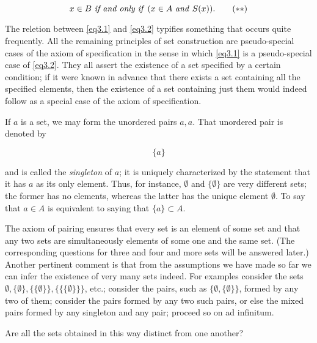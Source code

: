 \begin{equation}
\label{eq3.2}
x \in B \text{ \textit{if and only if} } (x \in A \text{ \textit{and} }  S(x)). \tag{$\ast \ast$}
\end{equation}

The reletion between \eqref{eq3.1} and \eqref{eq3.2} typifies something that occurs quite frequently. All the remaining principles of set construction are pseudo-special cases of the axiom of specification in the sense in which \eqref{eq3.1} is a pseudo-special case of \eqref{eq3.2}. They all assert the existence of a set specified by a certain condition; if it were known in advance that there exists a set containing all the specified elements, then the existence of a set containing just them would indeed follow as a special case of the axiom of specification. 

If $a$ is a set, we may form the unordered pairs ${a, a}$. That unordered pair is denoted by 

\begin{equation*}
\{ a \}
\end{equation*}

and is called the \textit{singleton} of $a$; it is uniquely characterized by the statement that it has $a$ as its only element. Thus, for instance, $ \emptyset $ and $ \{ \emptyset \}$ are very different sets; the former has no elements, whereas the latter has the unique element $ \emptyset $. To say that $a \in A$ is equivalent to saying that $\{a\} \subset A$. 

The axiom of pairing ensures that every set is an element of some set and that any two sets are simultaneously elements of some one and the same set. (The corresponding questions for three and four and more sets will be answered later.) Another pertinent comment is that from the assumptions we have made so far we can infer the existence of very many sets indeed. For examples  consider the sets $ \emptyset, \{ \emptyset \}, \{ \{ \emptyset \} \}, \{ \{ \{ \emptyset \} \} \} $, etc.; consider the pairs, such as  $ \{ \emptyset, \{ \emptyset \} \}$, formed by any two of them; consider the pairs formed by any two such pairs, or else the mixed pairs formed by any singleton and any pair; proceed so on ad infinitum.

\begin{exercise} Are all the sets obtained in this way distinct from one another? 
\end{exercise}

